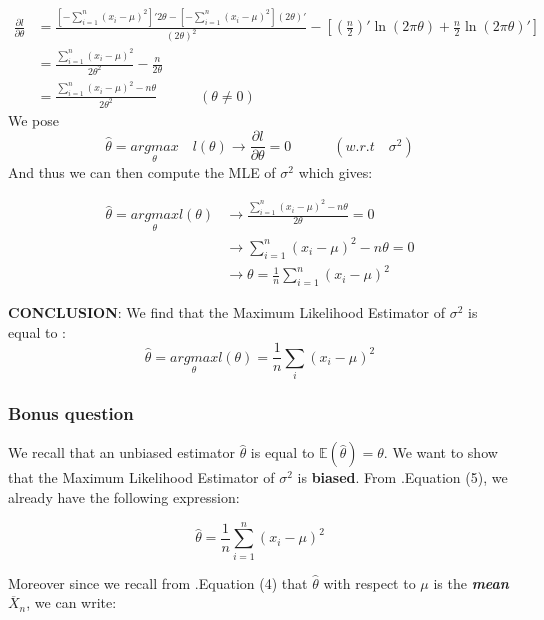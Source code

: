 \documentclass{article}
\begin{document}
\[
\begin{split}
\frac{\partial l}{\partial \theta} & = \frac{\left[ -\sum\limits_{i=1}^{n}(x_i -\mu)^2\right]'2\theta - \left[ -\sum\limits_{i=1}^{n}(x_i -\mu)^2\right](2\theta)'}{(2\theta)^2} - \left[(\frac{n}{2})'\ln(2\pi\theta) + \frac{n}{2}\ln(2\pi\theta)'\right] \\
& = \frac{\sum\limits_{i=1}^{n}(x_i-\mu)^2}{2\theta^2}-\frac{n}{2\theta} \\
& = \frac{\sum\limits_{i=1}^{n}(x_i-\mu)^2 - n\theta}{2\theta^2} \quad\quad\quad (\theta \neq  0)
\end{split}
\]
We pose 
\[
\hat{\theta}= \underset{\theta}{argmax}\quad l(\theta) \longrightarrow \frac{\partial l}{\partial \theta} = 0 \quad\quad\quad (w.r.t \quad \sigma^2)
\]
And thus we can then compute the MLE of $\sigma^2$ which gives:

\[
\begin{split}
\hat{\theta} = \underset{\theta}{argmax}l(\theta) & \longrightarrow \frac{\sum\limits_{i=1}^{n}(x_i-\mu)^2-n\theta}{2\theta} = 0  \\
& \longrightarrow \sum\limits_{i=1}^{n}(x_i-\mu)^2-n\theta = 0 \\
& \longrightarrow \theta = \frac{1}{n}\sum\limits_{i = 1}^{n}(x_i-\mu)^2
\end{split}
\]

\textbf{CONCLUSION}: We find that the Maximum Likelihood Estimator of $\sigma^2$ is equal to :
\begin{equation} \label{eq3}
\boxed{
\hat{\theta} = \underset{\theta}{argmax}l(\theta) = \frac{1}{n}\sum\limits_{i}(x_i-\mu)^2
}
\end{equation}

\subsubsection{Bonus question}

We recall that an unbiased estimator $\hat{\theta}$ is equal to $\mathbb{E}(\hat{\theta})=\theta$.
\newline We want to show that the Maximum Likelihood Estimator of $\sigma^2$ is \textbf{biased}.
\newline From .Equation (5), we already have the following expression:

\[
\hat{\theta} = \frac{1}{n}\sum\limits_{i=1}^{n}(x_i - \mu)^2
\]

Moreover since we recall from .Equation (4) that $\hat{\theta}$ with respect to $\mu$ is the \textit{\textbf{mean}} $\overline{X}_n$, we can write:
\end{document}

